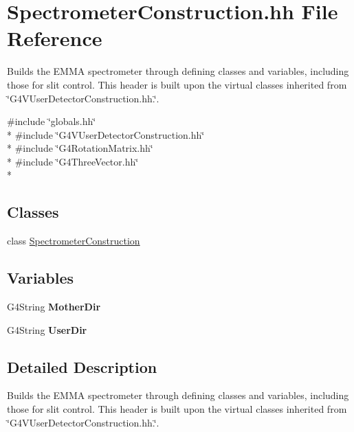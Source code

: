 \hypertarget{SpectrometerConstruction_8hh}{\section{Spectrometer\-Construction.\-hh File Reference}
\label{SpectrometerConstruction_8hh}
}


Builds the E\-M\-M\-A spectrometer through defining classes and variables, including those for slit control. This header is built upon the virtual classes inherited from \char`\"{}\-G4\-V\-User\-Detector\-Construction.\-hh.\char`\"{}.  


{\ttfamily \#include \char`\"{}globals.\-hh\char`\"{}}\\*
{\ttfamily \#include \char`\"{}G4\-V\-User\-Detector\-Construction.\-hh\char`\"{}}\\*
{\ttfamily \#include \char`\"{}G4\-Rotation\-Matrix.\-hh\char`\"{}}\\*
{\ttfamily \#include \char`\"{}G4\-Three\-Vector.\-hh\char`\"{}}\\*
\subsection*{Classes}
\begin{DoxyCompactItemize}
\item 
class \hyperlink{classSpectrometerConstruction}{Spectrometer\-Construction}
\end{DoxyCompactItemize}
\subsection*{Variables}
\begin{DoxyCompactItemize}
\item 
\hypertarget{SpectrometerConstruction_8hh_a28a3faf9b4768b420044f0d81fa645b7}{G4\-String {\bfseries Mother\-Dir}}\label{SpectrometerConstruction_8hh_a28a3faf9b4768b420044f0d81fa645b7}

\item 
\hypertarget{SpectrometerConstruction_8hh_a8558631b93942e4ae79b3feb21c97c8f}{G4\-String {\bfseries User\-Dir}}\label{SpectrometerConstruction_8hh_a8558631b93942e4ae79b3feb21c97c8f}

\end{DoxyCompactItemize}


\subsection{Detailed Description}
Builds the E\-M\-M\-A spectrometer through defining classes and variables, including those for slit control. This header is built upon the virtual classes inherited from \char`\"{}\-G4\-V\-User\-Detector\-Construction.\-hh.\char`\"{}. 